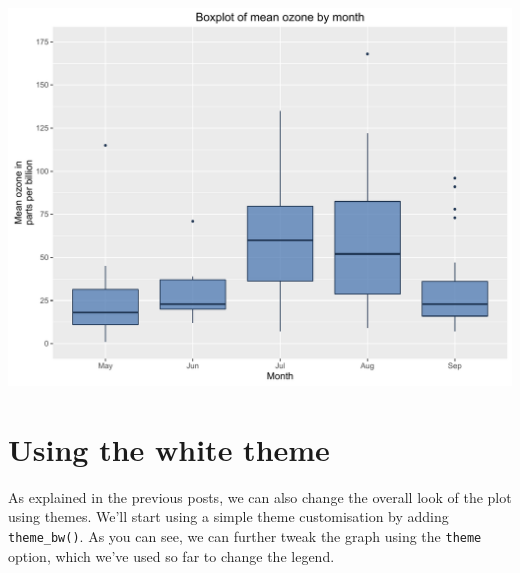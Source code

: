 \begin{Shaded}
\begin{Highlighting}[]
\StringTok{ }\NormalTok{(}  \StringTok{ }
\StringTok{       }\NormalTok{(}   \NormalTok{,}
\StringTok{         } \NormalTok{, } \NormalTok{) +}
\StringTok{       }\NormalTok{(} \NormalTok{,}
\StringTok{         } \NormalTok{(}\NormalTok{, }\NormalTok{, }\NormalTok{),}\NormalTok{(}\NormalTok{, }\NormalTok{)) +}
\StringTok{       }\NormalTok{(} \NormalTok{) +}
\StringTok{       }\NormalTok{(}\NormalTok{)}
\end{Highlighting}
\end{Shaded}

\begin{center}\includegraphics[width=0.55\linewidth]{figures/box_9-1} \end{center}

\section{Using the white theme}\label{using-the-white-theme-9}

As explained in the previous posts, we can also change the overall look
of the plot using themes. We'll start using a simple theme customisation
by adding \texttt{theme\_bw()}. As you can see, we can further tweak the
graph using the \texttt{theme} option, which we've used so far to change
the legend.


